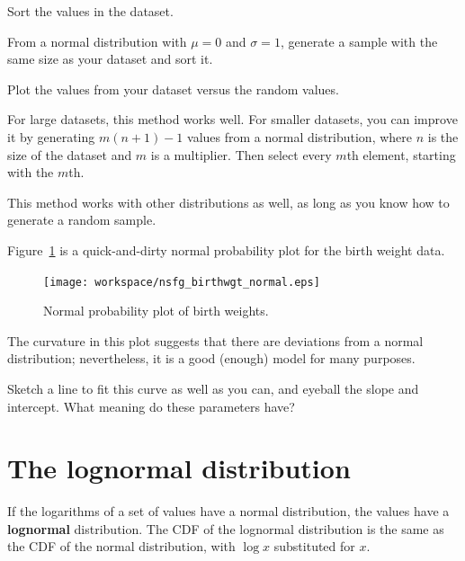 \documentclass[12pt]{book}
\begin{document}
\begin{description}

\item Sort the values in the dataset.

\item From a normal distribution with $\mu = 0$ and $\sigma = 1$,
generate a sample with the same size as your dataset and sort it.

\item Plot the values from your dataset versus the random values.

\end{description}

For large datasets, this method works well.
For smaller datasets, you can improve it by generating $m (n+1) - 1$
values from a normal distribution, where $n$ is the size of the
dataset and $m$ is a multiplier.  Then select every $m$th element,
starting with the $m$th.  


This method works with other distributions as well, as long as
you know how to generate a random sample.

Figure~\ref{nsfg_birthwgt_normal} is a quick-and-dirty normal
probability plot for the birth weight data.

\begin{figure}
\centerline{\texttt{[image: workspace/nsfg\_birthwgt\_normal.eps]}}
\caption{Normal probability plot of birth weights.}
\label{nsfg_birthwgt_normal}
\end{figure}

The curvature in this plot suggests that there are
deviations from a normal distribution; nevertheless, it is a
good (enough) model for many purposes.

\begin{ex}

Sketch a line to fit this curve as well as you can, and
eyeball the slope and intercept.  What meaning do these parameters have?

\end{ex}


\section{The lognormal distribution}
\label{lognormal}

If the logarithms of a set of values have a normal distribution, the
values have a {\bf lognormal} distribution.  The CDF of the lognormal
distribution is the same as the CDF of the normal distribution,
with $\log x$ substituted for $x$.
\end{document}
